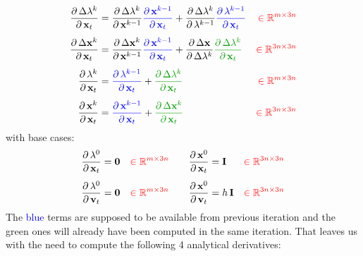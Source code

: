 \documentclass{article}
\newcommand{\pd}[2]{\dfrac{\partial\, #1}{\partial\, #2}}
\newcommand{\red}[1]{\textcolor{red}{#1}}
\newcommand{\blue}[1]{\textcolor{blue}{#1}}
\newcommand{\green}[1]{\textcolor{MyGreen}{#1}}
\begin{document}
\begin{equation}
\begin{aligned}
\label{eq:diffXPBD:explicit:four_needed_derivatives}
\pd{\Delta\lambda^k}{\mathbf{x}_t} &= 
     \pd{\Delta\lambda^k}{\mathbf{x}^{k-1}}
     \blue{\pd{\mathbf{x}^{k-1}}{\mathbf{x}_t}} +
     \pd{\Delta\lambda^k}{\lambda^{k-1}}
     \blue{\pd{\lambda^{k-1}}{\mathbf{x}_t}} 
     &\red{\in \mathbb{R}^{m \times 3n}}   
\\[1ex]
\pd{\Delta\mathbf{x}^k}{\mathbf{x}_t} &= 
     \pd{\Delta\mathbf{x}^k}{\mathbf{x}^{k-1}} 
     \blue{\pd{\mathbf{x}^{k-1}}{\mathbf{x}_t}} + 
     \pd{\Delta\mathbf{x}}{\Delta \lambda^k}
     \green{\pd{\Delta\lambda^k}{\mathbf{x}_t}}
     &\red{\in \mathbb{R}^{3n \times 3n}}
\\[1ex]
\pd{\lambda^k}{\mathbf{x}_t} &= 
     \blue{\pd{\lambda^{k-1}}{\mathbf{x}_t}} +  
     \green{\pd{\Delta\lambda^k}{\mathbf{x}_t}}
     &\red{\in \mathbb{R}^{m \times 3n}}
\\[1ex]
\pd{\mathbf{x}^k}{\mathbf{x}_t} &= 
     \blue{\pd{\mathbf{x}^{k-1}}{\mathbf{x}_t}} +  
     \green{\pd{\Delta\mathbf{x}^k}{\mathbf{x}_t}}
     &\red{\in \mathbb{R}^{3n \times 3n}}
\end{aligned}    
\end{equation}
with base cases:
\begin{equation}
\begin{aligned}   
\pd{\lambda^0}{\mathbf{x}_t} &= \mathbf{0}
     &\red{\in \mathbb{R}^{m \times 3n}}
\qquad
\pd{\mathbf{x}^0}{\mathbf{x}_t} &= \mathbf{I}
     &\red{\in \mathbb{R}^{3n \times 3n}}
\\[1ex]
\pd{\lambda^0}{\mathbf{v}_t} &= \mathbf{0}
     &\red{\in \mathbb{R}^{m \times 3n}}
\qquad
\pd{\mathbf{x}^0}{\mathbf{v}_t} &= h\,\mathbf{I}
     &\red{\in \mathbb{R}^{3n \times 3n}}
\end{aligned}    
\end{equation}
The \blue{blue} terms are supposed to be available from previous iteration and the \green{green} ones will already have been computed in the same iteration. That leaves us with the need to compute the following 4 analytical derivatives:
\end{document}

